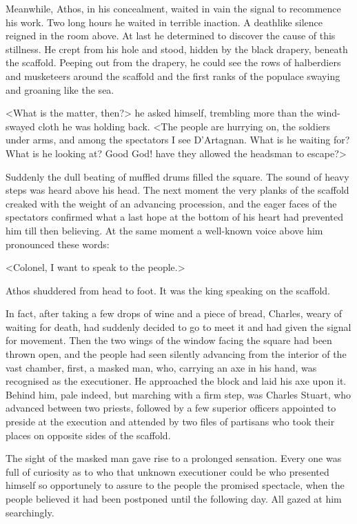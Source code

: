 Meanwhile, Athos, in his concealment, waited in vain the signal to recommence his work. Two long hours he waited in terrible inaction. A deathlike silence reigned in the room above. At last he determined to discover the cause of this stillness. He crept from his hole and stood, hidden by the black drapery, beneath the scaffold. Peeping out from the drapery, he could see the rows of halberdiers and musketeers around the scaffold and the first ranks of the populace swaying and groaning like the sea.

<What is the matter, then?> he asked himself, trembling more than the wind-swayed cloth he was holding back. <The people are hurrying on, the soldiers under arms, and among the spectators I see D'Artagnan. What is he waiting for? What is he looking at? Good God! have they allowed the headsman to escape?>

Suddenly the dull beating of muffled drums filled the square. The sound of heavy steps was heard above his head. The next moment the very planks of the scaffold creaked with the weight of an advancing procession, and the eager faces of the spectators confirmed what a last hope at the bottom of his heart had prevented him till then believing. At the same moment a well-known voice above him pronounced these words:

<Colonel, I want to speak to the people.>

Athos shuddered from head to foot. It was the king speaking on the scaffold.

In fact, after taking a few drops of wine and a piece of bread, Charles, weary of waiting for death, had suddenly decided to go to meet it and had given the signal for movement. Then the two wings of the window facing the square had been thrown open, and the people had seen silently advancing from the interior of the vast chamber, first, a masked man, who, carrying an axe in his hand, was recognised as the executioner. He approached the block and laid his axe upon it. Behind him, pale indeed, but marching with a firm step, was Charles Stuart, who advanced between two priests, followed by a few superior officers appointed to preside at the execution and attended by two files of partisans who took their places on opposite sides of the scaffold.

The sight of the masked man gave rise to a prolonged sensation. Every one was full of curiosity as to who that unknown executioner could be who presented himself so opportunely to assure to the people the promised spectacle, when the people believed it had been postponed until the following day. All gazed at him searchingly.

